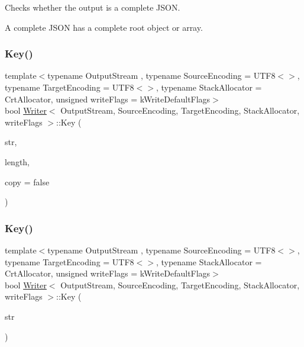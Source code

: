 Checks whether the output is a complete J\+S\+ON. 

A complete J\+S\+ON has a complete root object or array. \mbox{\label{classWriter_a19096d2ccb90761f63ab1240337bf90a}} 
\subsubsection{\texorpdfstring{Key()}{Key()}\hspace{0.1cm}{\footnotesize\ttfamily [1/2]}}
{\footnotesize\ttfamily template$<$typename Output\+Stream , typename Source\+Encoding  = U\+T\+F8$<$$>$, typename Target\+Encoding  = U\+T\+F8$<$$>$, typename Stack\+Allocator  = Crt\+Allocator, unsigned write\+Flags = k\+Write\+Default\+Flags$>$ \\
bool \hyperlink{classWriter}{Writer}$<$ Output\+Stream, Source\+Encoding, Target\+Encoding, Stack\+Allocator, write\+Flags $>$\+::Key (\begin{DoxyParamCaption}\item[{const \hyperlink{classWriter_ab08bff5fd2daec65f4a78779ca3d2139}{Ch} $\ast$}]{str,  }\item[{\hyperlink{rapidjson_8h_a5ed6e6e67250fadbd041127e6386dcb5}{Size\+Type}}]{length,  }\item[{bool}]{copy = {\ttfamily false} }\end{DoxyParamCaption})\hspace{0.3cm}{\ttfamily [inline]}}

\mbox{\label{classWriter_ab6057b7fa9737edb4da55a7afefa966d}} 
\subsubsection{\texorpdfstring{Key()}{Key()}\hspace{0.1cm}{\footnotesize\ttfamily [2/2]}}
{\footnotesize\ttfamily template$<$typename Output\+Stream , typename Source\+Encoding  = U\+T\+F8$<$$>$, typename Target\+Encoding  = U\+T\+F8$<$$>$, typename Stack\+Allocator  = Crt\+Allocator, unsigned write\+Flags = k\+Write\+Default\+Flags$>$ \\
bool \hyperlink{classWriter}{Writer}$<$ Output\+Stream, Source\+Encoding, Target\+Encoding, Stack\+Allocator, write\+Flags $>$\+::Key (\begin{DoxyParamCaption}\item[{const \hyperlink{classWriter_ab08bff5fd2daec65f4a78779ca3d2139}{Ch} $\ast$const \&}]{str }\end{DoxyParamCaption})\hspace{0.3cm}{\ttfamily [inline]}}

